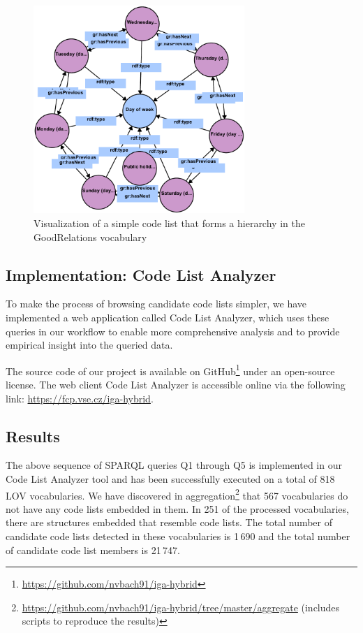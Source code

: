 \begin{figure}[h]
\centering
\includegraphics[width=8cm]{figures/code-list-days-of-week}
\caption{Visualization of a simple code list that forms a hierarchy in the GoodRelations vocabulary}
\label{fig:code-list-with-hierarchy}
\end{figure}

\subsection{Implementation: Code List Analyzer}

To make the process of browsing candidate code lists simpler, we have implemented a web application called Code List Analyzer, which uses these queries in our workflow to enable more comprehensive analysis and to provide empirical insight into the queried data.

The source code of our project is available on GitHub\footnote{\label{github-repo}\url{https://github.com/nvbach91/iga-hybrid}} under an open-source license. The web client Code List Analyzer is accessible online via the following link: \url{https://fcp.vse.cz/iga-hybrid}.

\subsection{Results}

The above sequence of SPARQL queries Q1 through Q5 is implemented in our Code List Analyzer tool and has been successfully executed on a total of 818 LOV vocabularies. %
We have discovered in aggregation\footnote{\url{https://github.com/nvbach91/iga-hybrid/tree/master/aggregate} (includes scripts to reproduce the results)} that 567 vocabularies do not have any code lists embedded in them. %
In 251 of the processed vocabularies, there are structures embedded that resemble code lists. The total number of candidate code lists detected in these vocabularies is 1\,690 and the total number of candidate code list members is 21\,747.

